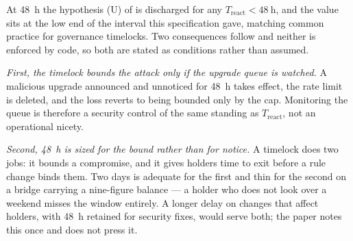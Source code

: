 \begin{remark}
\begin{remark}

At \qty{48}{\hour} the hypothesis (U) of  is discharged for any
$T_{\mathrm{react}} < \qty{48}{\hour}$, and the value sits at the low end of the interval this
specification gave, matching common practice for governance timelocks. Two consequences follow and
neither is enforced by code, so both are stated as conditions rather than assumed.

\emph{First, the timelock bounds the attack only if the upgrade queue is watched.} A malicious
upgrade announced and unnoticed for \qty{48}{\hour} takes effect, the rate limit is deleted, and the
loss reverts to being bounded only by the cap. Monitoring the queue is therefore a security control
of the same standing as $T_{\mathrm{react}}$, not an operational nicety.

\emph{Second, \qty{48}{\hour} is sized for the bound rather than for notice.} A timelock does two
jobs: it bounds a compromise, and it gives holders time to exit before a rule change binds them. Two
days is adequate for the first and thin for the second on a bridge carrying a nine-figure balance ---
a holder who does not look over a weekend misses the window entirely. A longer delay on changes that
affect holders, with \qty{48}{\hour} retained for security fixes, would serve both; the paper notes
this once and does not press it.
\end{remark}
\end{remark}

